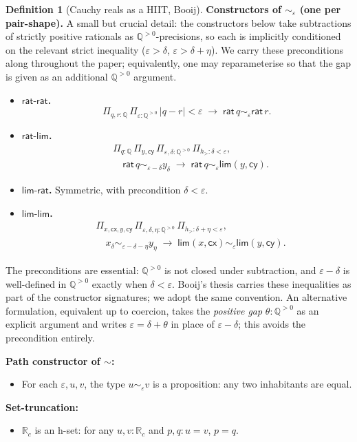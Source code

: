 \documentclass[12pt]{article}
\theoremstyle{definition}
\newtheorem{definition}[theorem]{Definition}
\theoremstyle{remark}
\newcommand{\Q}{\mathbb{Q}}
\newcommand{\Rc}{\mathbb{R}_{c}}
\newcommand{\rat}{\mathsf{rat}}
\newcommand{\hlim}{\mathsf{lim}}
\newcommand{\close}{\mathrel{\sim}}
\begin{document}
\begin{definition}[Cauchy reals as a HIIT, Booij]
\textbf{Constructors of $\close_{\varepsilon}$ (one per pair-shape).}
A small but crucial detail: the constructors below take subtractions
of strictly positive rationals as $\Q^{>0}$-precisions, so each is
implicitly conditioned on the relevant strict inequality
($\varepsilon > \delta$, $\varepsilon > \delta + \eta$). We carry these
preconditions along throughout the paper; equivalently, one may
reparameterise so that the gap is given as an additional
$\Q^{>0}$ argument.
\begin{itemize}
\item \textbf{$\mathsf{rat\text{-}rat}$.}
\[
\Pi_{q, r : \Q}\,\Pi_{\varepsilon : \Q^{>0}}\,
   |q - r| < \varepsilon \;\longrightarrow\;
   \rat\,q \close_{\varepsilon} \rat\,r.
\]
\item \textbf{$\mathsf{rat\text{-}lim}$.}
\[
\begin{aligned}
&\Pi_{q : \Q}\,\Pi_{y, \mathsf{cy}}\,
\Pi_{\varepsilon, \delta : \Q^{>0}}\,
\Pi_{h_{>} : \delta < \varepsilon}, \\
&\quad \rat\,q \close_{\varepsilon - \delta} y_{\delta} \;\longrightarrow\;
   \rat\,q \close_{\varepsilon} \hlim(y, \mathsf{cy}).
\end{aligned}
\]
\item \textbf{$\mathsf{lim\text{-}rat}$.} Symmetric, with precondition
$\delta < \varepsilon$.
\item \textbf{$\mathsf{lim\text{-}lim}$.}
\[
\begin{aligned}
&\Pi_{x, \mathsf{cx}, y, \mathsf{cy}}\,
\Pi_{\varepsilon, \delta, \eta : \Q^{>0}}\,
\Pi_{h_{>} : \delta + \eta < \varepsilon}, \\
&\quad x_{\delta} \close_{\varepsilon - \delta - \eta} y_{\eta}
   \;\longrightarrow\;
   \hlim(x,\mathsf{cx}) \close_{\varepsilon} \hlim(y,\mathsf{cy}).
\end{aligned}
\]
\end{itemize}
The preconditions are essential: $\Q^{>0}$ is not closed under
subtraction, and $\varepsilon - \delta$ is well-defined in $\Q^{>0}$
exactly when $\delta < \varepsilon$. Booij's thesis
\cite[Definition~6.2.1]{Booij2020} carries these inequalities as part
of the constructor signatures; we adopt the same convention. An
alternative formulation, equivalent up to coercion, takes the
\emph{positive gap} $\theta : \Q^{>0}$ as an explicit argument and
writes $\varepsilon = \delta + \theta$ in place of $\varepsilon - \delta$;
this avoids the precondition entirely.

\textbf{Path constructor of $\close$:}
\begin{itemize}
\item For each $\varepsilon, u, v$, the type $u \close_{\varepsilon} v$ is
a proposition: any two inhabitants are equal.
\end{itemize}

\textbf{Set-truncation:}
\begin{itemize}
\item $\Rc$ is an h-set: for any $u, v : \Rc$ and $p, q : u = v$, $p = q$.
\end{itemize}
\end{definition}
\end{document}
